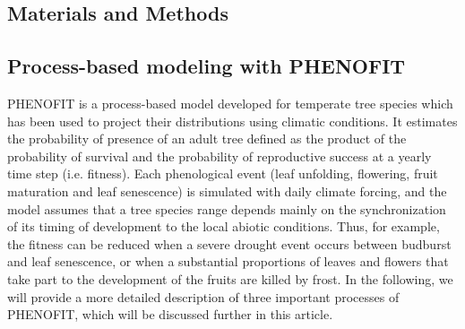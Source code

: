\documentclass[letterpaper,8pt]{extarticle}  %
\begin{document}
\begin{doublespacing}
\begin{linenumbers}





\section{Materials and Methods}

\subsection{Process-based modeling with PHENOFIT}

PHENOFIT is a process-based model developed for temperate tree species which has been used to project their distributions using climatic conditions. It estimates the probability of presence of an adult tree defined as the product of the probability of survival and the probability of reproductive success at a yearly time step (i.e. fitness). 
Each phenological event (leaf unfolding, flowering, fruit maturation and leaf senescence) is simulated with daily climate forcing, and the model assumes that a tree species range depends mainly on the synchronization of its timing of development to the local abiotic conditions. Thus, for example, the fitness can be reduced when a severe drought event occurs between budburst and leaf senescence, or when a substantial proportions of leaves and flowers that take part to the development of the fruits are killed by frost. In the following, we will provide a more detailed description of three important processes of PHENOFIT, which will be discussed further in this article.


\end{linenumbers}
\end{doublespacing}
\end{document}
